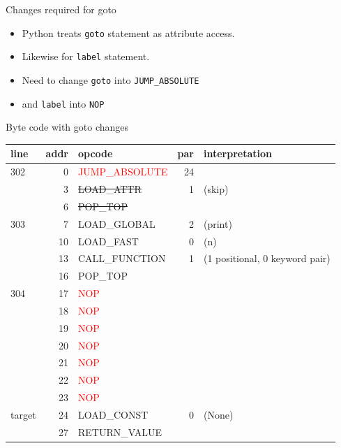 \documentclass{beamer}
\begin{document}
\begin{frame}[fragile]{Changes required for goto}

\begin{itemize}
\item Python treats \verb!goto! statement as attribute access.
\item Likewise for \verb!label! statement.

\item Need to change \verb!goto! into \verb!JUMP_ABSOLUTE!

\item and \verb!label! into \verb!NOP!
\end{itemize}
\end{frame}

\begin{frame}[fragile]{Byte code with goto changes}
\begin{tabular}{l|r|l|r|l}
line & addr & opcode & par & interpretation \\
\hline
302 &          0 & \textcolor{red}{JUMP\_ABSOLUTE}         &     24 &  \\
     &           3 &  \sout{LOAD\_ATTR}               &   1  & (skip)  \\
      &          6 &  \sout{POP\_TOP}      &  &           \\
\hline
303   &          7 &  LOAD\_GLOBAL         &       2  & (print)  \\
          &     10 &  LOAD\_FAST           &       0 &  (n)  \\
              & 13 &  CALL\_FUNCTION        &      1  & (1 positional, 0 keyword pair)  \\
     &          16 &  POP\_TOP            &     &  \\
\hline
304   &         17 &  \textcolor{red}{NOP}        &          &   \\
      &         18 &  \textcolor{red}{NOP}        &          &   \\
      &         19 &  \textcolor{red}{NOP}        &          &   \\
      &         20 &  \textcolor{red}{NOP}        &          &   \\
      &         21 &  \textcolor{red}{NOP}        &          &   \\
      &         22 &  \textcolor{red}{NOP}        &          &   \\
      &         23 &  \textcolor{red}{NOP}        &          &   \\
\hline
target     &          24 &  LOAD\_CONST         &        0  & (None)  \\
     &          27 &  RETURN\_VALUE      &      &  \\
\end{tabular}
\end{frame}
\end{document}
